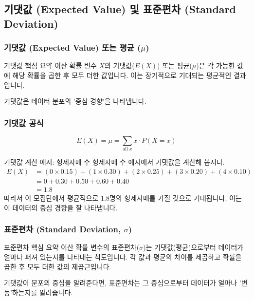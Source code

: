 \documentclass[11pt,a4paper]{article}
\begin{document}
\newpage
\subsection{기댓값 (Expected Value) 및 표준편차 (Standard Deviation)}

\subsubsection*{기댓값 (Expected Value) 또는 평균 (\(\mu\))}

\begin{summarybox}{기댓값 핵심 요약}
이산 확률 변수 \(X\)의 기댓값(\(E(X)\)) 또는 평균(\(\mu\))은 각 가능한 값에 해당 확률을 곱한 후 모두 더한 값입니다. 이는 장기적으로 기대되는 평균적인 결과입니다.
\end{summarybox}

기댓값은 데이터 분포의 '중심 경향'을 나타냅니다.

\subsubsection*{기댓값 공식}
\[ E(X) = \mu = \sum_{\text{all } x} x \cdot P(X=x) \]

\begin{examplebox}{기댓값 계산 예시: 형제자매 수}
형제자매 수 예시에서 기댓값을 계산해 봅시다.
\begin{align*} E(X) &= (0 \times 0.15) + (1 \times 0.30) + (2 \times 0.25) + (3 \times 0.20) + (4 \times 0.10) \\ &= 0 + 0.30 + 0.50 + 0.60 + 0.40 \\ &= 1.8 \end{align*}
따라서 이 모집단에서 평균적으로 1.8명의 형제자매를 가질 것으로 기대됩니다. 이는 이 데이터의 중심 경향을 잘 나타냅니다.
\end{examplebox}

\subsubsection*{표준편차 (Standard Deviation, \(\sigma\))}

\begin{summarybox}{표준편차 핵심 요약}
이산 확률 변수의 표준편차(\(\sigma\))는 기댓값(평균)으로부터 데이터가 얼마나 퍼져 있는지를 나타내는 척도입니다. 각 값과 평균의 차이를 제곱하고 확률을 곱한 후 모두 더한 값의 제곱근입니다.
\end{summarybox}

기댓값이 분포의 중심을 알려준다면, 표준편차는 그 중심으로부터 데이터가 얼마나 '변동'하는지를 알려줍니다.
\end{document}
